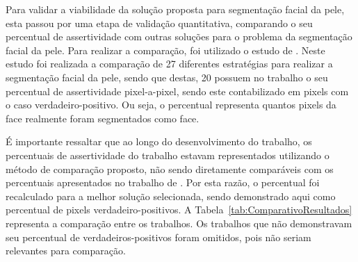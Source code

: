 \documentclass[12pt,oneside,a4paper,english,french,spanish,brazil,]{abntex2}
\begin{document}
Para validar a viabilidade da solução proposta para segmentação facial da pele, esta passou por uma etapa de validação quantitativa, comparando o seu percentual de assertividade com outras soluções para o problema da segmentação facial da pele. Para realizar a comparação, foi utilizado o estudo de \citet{kakumanu:2007}. Neste estudo foi realizada a comparação de 27 diferentes estratégias para realizar a segmentação facial da pele, sendo que destas, 20 possuem no trabalho o seu percentual de assertividade pixel-a-pixel, sendo este contabilizado em pixels com o caso verdadeiro-positivo. Ou seja, o percentual representa quantos pixels da face realmente foram segmentados como face.

É importante ressaltar que ao longo do desenvolvimento do trabalho, os percentuais de assertividade do trabalho estavam representados utilizando o método de comparação proposto, não sendo diretamente comparáveis com os percentuais apresentados no trabalho de \citet{kakumanu:2007}. Por esta razão, o percentual foi recalculado para a melhor solução selecionada, sendo demonstrado aqui como percentual de pixels verdadeiro-positivos. A Tabela~\ref{tab:ComparativoResultados} representa a comparação entre os trabalhos. Os trabalhos que não demonstravam seu percentual de verdadeiros-positivos foram omitidos, pois não seriam relevantes para comparação.
\end{document}

